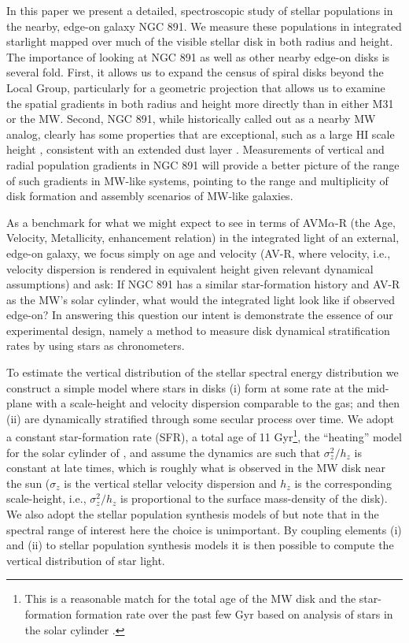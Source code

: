 In this paper we present a detailed, spectroscopic study of stellar
populations in the nearby, edge-on galaxy NGC 891. We measure these
populations in integrated starlight mapped over much of the visible
stellar disk in both radius and height. The importance of looking at
NGC 891 as well as other nearby edge-on disks is several fold. First,
it allows us to expand the census of spiral disks beyond the Local
Group, particularly for a geometric projection that allows us to
examine the spatial gradients in both radius and height more directly
than in either M31 or the MW.  Second, NGC 891, while historically
called out as a nearby MW analog, clearly has some properties that are
exceptional, such as a large HI scale height \citep[$\sim$1
kpc][]{Oosterloo07}, consistent with an extended dust layer
\citep{Howk00}. Measurements of vertical and radial population
gradients in NGC 891 will provide a better picture of the range of
such gradients in MW-like systems, pointing to the range and
multiplicity of disk formation and assembly scenarios of MW-like
galaxies.

As a benchmark for what we might expect to see in terms of
AVM$\alpha$-R (the Age, Velocity, Metallicity, enhancement relation)
in the integrated light of an external, edge-on galaxy, we focus
simply on age and velocity (AV-R, where velocity, i.e., velocity
dispersion is rendered in equivalent height given relevant dynamical
assumptions) and ask: If NGC 891 has a similar star-formation history
and AV-R as the MW's solar cylinder, what would the integrated light
look like if observed edge-on? In answering this question our
intent is demonstrate the essence of our experimental design, namely a
method to measure disk dynamical stratification rates by using stars
as chronometers.

To estimate the vertical distribution of the stellar spectral energy
distribution we construct a simple model where stars in disks (i) form
at some rate at the mid-plane with a scale-height and velocity
dispersion comparable to the gas; and then (ii) are dynamically
stratified through some secular process over time. We adopt a constant
star-formation rate (SFR), a total age of 11 Gyr\footnote{This is a
  reasonable match for the total age of the MW disk and the
  star-formation formation rate over the past few Gyr based on
  analysis of stars in the solar cylinder
  \citep[e.g.,][]{Pilyugin96a}.}, the ``heating'' model for the solar
cylinder of \citet{Aumer09}, and assume the dynamics are such that
$\sigma_z^2/h_z$ is constant at late times, which is roughly what is
observed in the MW disk near the sun ($\sigma_z$ is the vertical
stellar velocity dispersion and $h_z$ is the corresponding
scale-height, i.e., $\sigma_z^2/h_z$ is proportional to the surface
mass-density of the disk). We also adopt the stellar population
synthesis models of \citet{Bruzual03} but note that in the spectral
range of interest here the choice is unimportant. By coupling elements
(i) and (ii) to stellar population synthesis models it is then
possible to compute the vertical distribution of star light.

